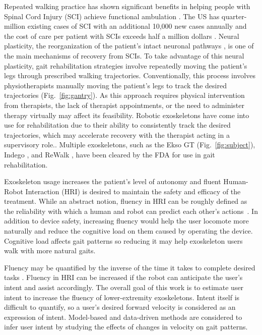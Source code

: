Repeated walking practice has shown significant benefits in helping people with Spinal Cord Injury (SCI) achieve functional ambulation \cite{lam2007systematic}. The US has quarter-million existing cases of SCI with an additional 10,000 new cases annually \cite{nih} and the cost of care per patient with SCIs exceeds half a million dollars \cite{devivo2011costs}. Neural plasticity, the reorganization of the patient's intact neuronal pathways \cite{curt2008recovery}, is one of the main mechanisms of recovery from SCIs. To take advantage of this neural plasticity, gait rehabilitation strategies involve repeatedly moving the patient's legs through prescribed walking trajectories. Conventionally, this process involves physiotherapists manually moving the patient's legs to track the desired trajectories (Fig.~\ref{fig:gantry}). %
As this approach requires physical intervention from therapists, the lack of therapist appointments, or the need to administer therapy virtually may affect its feasibility. Robotic exoskeletons have come into use for rehabilitation due to their ability to consistently track the desired trajectories, which may accelerate recovery \cite{hidler2011role} with the therapist acting in a supervisory role.. Multiple exoskeletons, such as the Ekso GT \cite{brenner2016exploring} (Fig.~\ref{fig:subject}), Indego \cite{sup2008design}, and ReWalk \cite{rewalk}, have been cleared by the FDA for use in gait rehabilitation.

Exoskeleton usage increases the patient's level of autonomy and fluent Human-Robot Interaction (HRI) is desired to maintain the safety and efficacy of the treatment. While an abstract notion, fluency in HRI can be roughly defined as the reliability with which a human and robot can predict each other's actions~\cite{hoffman2007cost}. In addition to device safety, increasing fluency would help the user locomote more naturally and reduce the cognitive load on them caused by operating the device. Cognitive load affects gait patterns \cite{bogen2018walk} so reducing it may help exoskeleton users walk with more natural gaits. 

Fluency may be quantified by the inverse of the time it takes to complete desired tasks \cite{hoffman2019evaluating}. Fluency in HRI can be increased if the robot can anticipate the user's intent and assist accordingly. The overall goal of this work is to estimate user intent to increase the fluency of lower-extremity exoskeletons. Intent itself is difficult to quantify, so a user's desired forward velocity is considered as an expression of intent. Model-based and data-driven methods are considered to infer user intent by studying the effects of changes in velocity on gait patterns.


